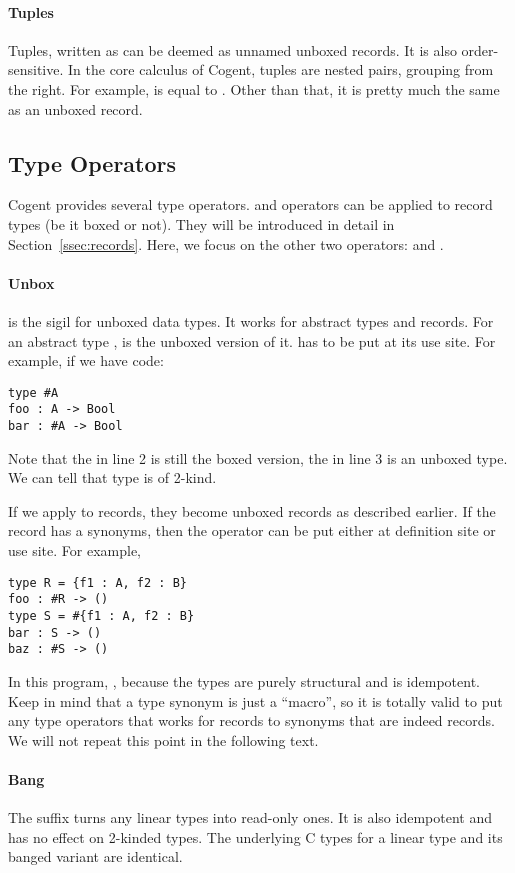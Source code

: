\documentclass[a4paper]{article}
\newcommand{\cogent}{Cogent\xspace}
\begin{document}
\paragraph{Tuples} Tuples, written as  can be deemed as unnamed unboxed records. It is also order-sensitive.
In the core calculus of \cogent, tuples are nested pairs, grouping from the right. For example,  is equal to
. Other than that, it is pretty much the same as an unboxed record.

\subsection{Type Operators}
\cogent provides several type operators.  and  operators can be applied to
record types (be it boxed or not). They will be introduced in detail in Section~\ref{ssec:records}.
Here, we focus on the other two operators: \code{\#} and \code{!}.

\paragraph{Unbox} \code{\#} is the sigil for unboxed data types. It works for
abstract types and records. For an abstract type , 
is the unboxed version of it. \code{\#} has to be put at its use site.
For example, if we have code:
\begin{lstlisting}[language=Cogent]
type #A
foo : A -> Bool
bar : #A -> Bool
\end{lstlisting}
Note that the  in line 2 is still the boxed version, the  in
line 3 is an unboxed type. We can tell that type  is of 2-kind.

If we apply \code{\#} to records, they become unboxed records as described earlier.
If the record has a synonyms, then the operator can be put either at definition site
or use site. For example,
\begin{lstlisting}[language=Cogent]
type R = {f1 : A, f2 : B}
foo : #R -> ()
type S = #{f1 : A, f2 : B}
bar : S -> ()
baz : #S -> ()
\end{lstlisting}
In this program, , because the types are purely structural and
\code{\#} is idempotent. Keep in mind that a type synonym is just a ``macro'',
so it is totally valid to put any type operators that works for records to
synonyms that are indeed records. We will not repeat this point in the following text.

\paragraph{Bang} The \code{!} suffix turns any linear types into read-only ones.
It is also idempotent and has no effect on 2-kinded types. The underlying C types
for a linear type and its banged variant are identical.
\end{document}
